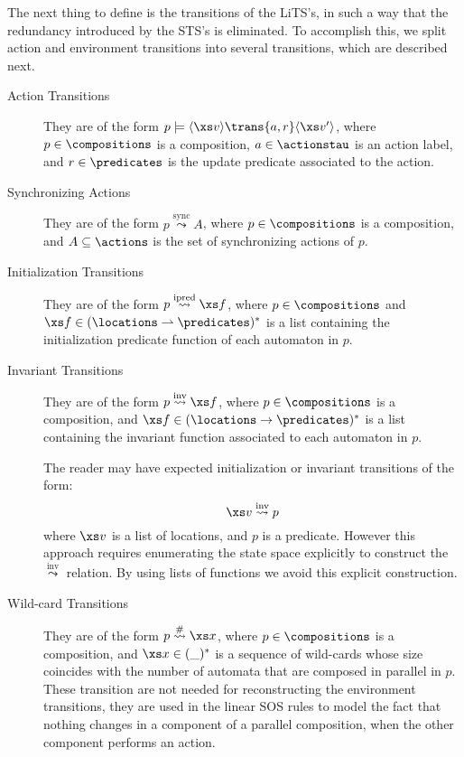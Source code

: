 \documentclass[submission,copyright,creativecommons,sharealike]{eptcs}
\newcommand{\sstate}[1]{\ensuremath{\langle #1 \rangle}}
\newcommand{\saof}[0]{
\ensuremath{\stackrel {\mathrm{sync}} {\leadsto}}
}
\newcommand{\compsof}[0]{
\ensuremath{\stackrel {\mathrm{\#}} {\leadsto}}
}
\newcommand{\ipredof}[0]{
\ensuremath{\stackrel {\mathrm{ipred}} {\leadsto}}
}
\newcommand{\invof}[0]{
\ensuremath{\stackrel {\mathrm{inv}} {\leadsto}}
}
\begin{document}
The next thing to define is the transitions of the LiTS's, in such a
way that the redundancy introduced by the STS's is eliminated. To
accomplish this, we split action and environment transitions into
several transitions, which are described next.

\begin{description}
\item[Action Transitions] They are of the form
$
  p \models \sstate{ \xs v} \trans{a, r} \sstate{\xs v'}
$,
where $p \in \compositions$ is a composition, $a \in \actionstau$ is
an action label, and $r \in \predicates$ is the update predicate
associated to the action.
\item[Synchronizing Actions] They are of the form
$
  p \saof A
$,
where $p \in \compositions$ is a composition, and $A \subseteq
\actions$ is the set of synchronizing actions of $p$.
\item[Initialization Transitions] They are of the form $p \ipredof \xs
  f$, where $p \in \compositions$ and $\xs f \in (\locations
  \rightharpoonup \predicates)^*$ is a list containing the
  initialization predicate function of each automaton in $p$.
\item[Invariant Transitions] They are of the form $ p \invof \xs f $,
  where $p \in \compositions$ is a composition, and $\xs f \in
  (\locations \rightarrow \predicates)^*$ is a list containing the
  invariant function associated to each automaton in $p$.

  The reader may have expected initialization or invariant
    transitions of the form:
  \begin{equation*}
    \xs v \invof p
  \end{equation*}
  where $\xs v$ is a list of locations, and $p$ is a predicate.
  However this approach requires enumerating the state space
  explicitly to construct the $\invof$ relation. By using lists of
  functions we avoid this explicit construction.
\item[Wild-card Transitions] They are of the form $ p \compsof \xs x $,
  where $p \in \compositions$ is a composition, and $\xs x \in (\_)^*$
  is a sequence of wild-cards whose size coincides with the number of
  automata that are composed in parallel in $p$. These transition are
  not needed for reconstructing the environment transitions, they are
  used in the linear SOS rules to model the fact that nothing changes
  in a component of a parallel composition, when the other component
  performs an action.
\end{description}
\end{document}
